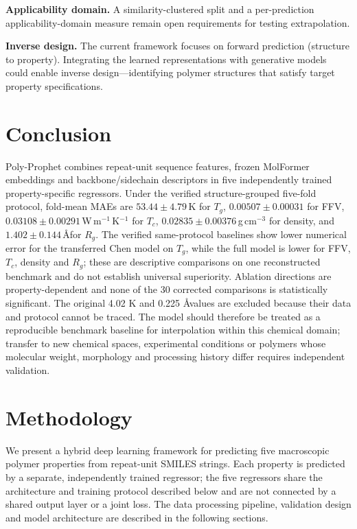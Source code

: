 \documentclass{article}
\begin{document}
\textbf{Applicability domain.} A similarity-clustered split and a per-prediction applicability-domain measure remain open requirements for testing extrapolation.

\textbf{Inverse design.} The current framework focuses on forward prediction (structure to property). Integrating the learned representations with generative models could enable inverse design---identifying polymer structures that satisfy target property specifications.

\section{Conclusion}
\label{sec:conclusion}

Poly-Prophet combines repeat-unit sequence features, frozen MolFormer embeddings and backbone/sidechain descriptors in five independently trained property-specific regressors. Under the verified structure-grouped five-fold protocol, fold-mean MAEs are \(53.44 \pm 4.79\)\,K for \(T_g\), \(0.00507 \pm 0.00031\) for FFV, \(0.03108 \pm 0.00291\)\,W\,m\(^{-1}\)\,K\(^{-1}\) for \(T_c\), \(0.02835 \pm 0.00376\)\,g\,cm\(^{-3}\) for density, and \(1.402 \pm 0.144\)\,\AA for \(R_g\). The verified same-protocol baselines show lower numerical error for the transferred Chen model on \(T_g\), while the full model is lower for FFV, \(T_c\), density and \(R_g\); these are descriptive comparisons on one reconstructed benchmark and do not establish universal superiority. Ablation directions are property-dependent and none of the 30 corrected comparisons is statistically significant. The original 4.02 K and 0.225 \AA values are excluded because their data and protocol cannot be traced. The model should therefore be treated as a reproducible benchmark baseline for interpolation within this chemical domain; transfer to new chemical spaces, experimental conditions or polymers whose molecular weight, morphology and processing history differ requires independent validation.

\section{Methodology}

We present a hybrid deep learning framework for predicting five macroscopic polymer properties from repeat-unit SMILES strings. Each property is predicted by a separate, independently trained regressor; the five regressors share the architecture and training protocol described below and are not connected by a shared output layer or a joint loss. The data processing pipeline, validation design and model architecture are described in the following sections.
\end{document}
